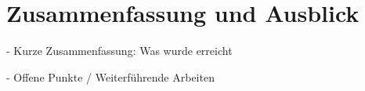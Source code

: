 \chapter{Zusammenfassung und Ausblick}


- Kurze Zusammenfassung: Was wurde erreicht

- Offene Punkte / Weiterführende Arbeiten